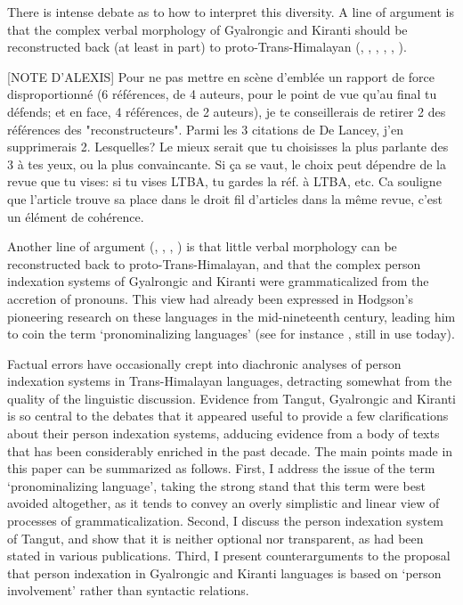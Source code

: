 \documentclass[oldfontcommands,oneside,a4paper,11pt]{article}
\begin{document}
There is intense debate as to how to interpret this diversity. A line of argument is that the complex verbal morphology of Gyalrongic and Kiranti should be reconstructed back (at least in part) to proto-Trans-Himalayan (\citealt{bauman75}, \citealt{delancey89agreement}, \citealt{driem93agreement}, \citealt{delancey10agreement}, \citealt{delancey11prefixes}, \citealt{jacques12agreement}). 

[NOTE D'ALEXIS] Pour ne pas mettre en scène d'emblée un rapport de force disproportionné (6 références, de 4 auteurs, pour le point de vue qu'au final tu défends; et en face, 4 références, de 2 auteurs), je te conseillerais de retirer 2 des références des "reconstructeurs". Parmi les 3 citations de De Lancey, j'en supprimerais 2. Lesquelles? Le mieux serait que tu choisisses la plus parlante des 3 à tes yeux, ou la plus convaincante. Si ça se vaut, le choix peut dépendre de la revue que tu vises: si tu vises LTBA, tu gardes la réf. à LTBA, etc. Ca souligne que l'article trouve sa place dans le droit fil d'articles dans la même revue, c'est un élément de cohérence. 

Another line of argument (\citealt{lapolla92},  \citealt{lapolla03}, \citealt{lapolla12comments}, \citealt{zeisler15eat}) is that little verbal morphology can be reconstructed back to proto-Trans-Himalayan, and that the complex person indexation systems of Gyalrongic and Kiranti were grammaticalized from the accretion of pronouns. This view had already been expressed in Hodgson's pioneering research on these languages in the mid-nineteenth century, leading him to coin the term `pronominalizing languages' (see for instance  \citealt{hodgson57sifan}, still in use today).

Factual errors have occasionally crept into diachronic analyses of person indexation systems in Trans-Himalayan languages, detracting somewhat from the quality of the linguistic discussion. Evidence from Tangut, Gyalrongic and Kiranti is so central to the debates that it appeared useful to provide a few clarifications about their person indexation systems, adducing evidence from a body of texts that has been considerably enriched in the past decade. The main points made in this paper can be summarized as follows. First, I address the issue of the term `pronominalizing language', taking the strong stand that this term were best avoided altogether, as it tends to convey an overly simplistic and linear view of processes of grammaticalization. Second, I discuss the person indexation system of Tangut, and show that it is neither optional nor transparent, as had been stated in various publications. Third, I present counterarguments to the proposal that person indexation in Gyalrongic and Kiranti languages is based on `person involvement' rather than syntactic relations. 
\end{document}
